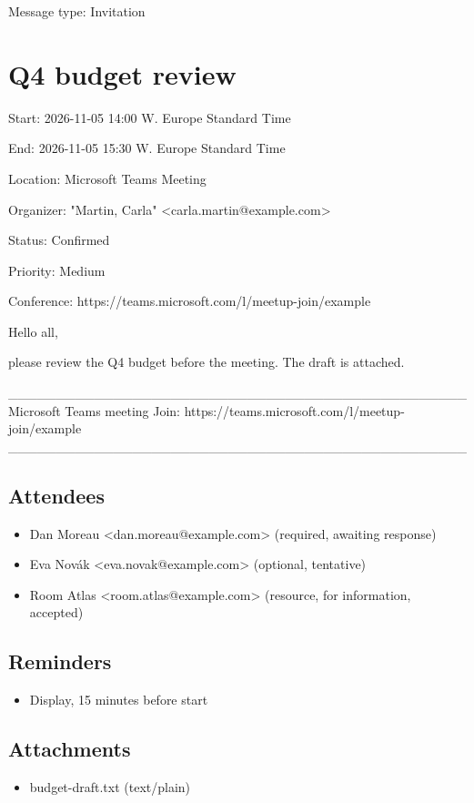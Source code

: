\documentclass[11pt,a4paper]{article}
\begin{document}
Message type: Invitation

\section{Q4 budget review}

Start: 2026-11-05 14:00 W. Europe Standard Time

End: 2026-11-05 15:30 W. Europe Standard Time

Location: Microsoft Teams Meeting

Organizer: "Martin, Carla" <carla.martin@example.com>

Status: Confirmed

Priority: Medium

Conference: https://teams.microsoft.com/l/meetup-join/example

Hello all,

please review the Q4 budget before the meeting. The draft is attached.

\_\_\_\_\_\_\_\_\_\_\_\_\_\_\_\_\_\_\_\_\_\_\_\_\_\_\_\_\_\_\_\_\_\_\_\_\_\_\_\_\_\_\_\_\_\_\_\_
Microsoft Teams meeting
Join: https://teams.microsoft.com/l/meetup-join/example
\_\_\_\_\_\_\_\_\_\_\_\_\_\_\_\_\_\_\_\_\_\_\_\_\_\_\_\_\_\_\_\_\_\_\_\_\_\_\_\_\_\_\_\_\_\_\_\_

\subsection{Attendees}

\begin{itemize}
\item Dan Moreau <dan.moreau@example.com> (required, awaiting response)
\item Eva Novák <eva.novak@example.com> (optional, tentative)
\item Room Atlas <room.atlas@example.com> (resource, for information, accepted)
\end{itemize}

\subsection{Reminders}

\begin{itemize}
\item Display, 15 minutes before start
\end{itemize}

\subsection{Attachments}

\begin{itemize}
\item budget-draft.txt (text/plain)
\end{itemize}
\end{document}
